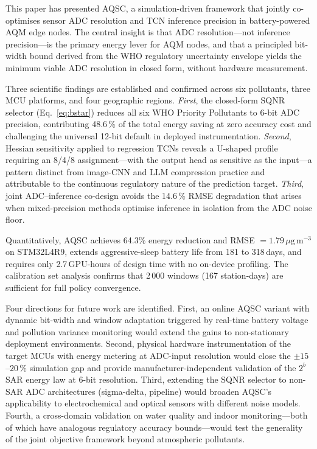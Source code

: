 \documentclass[12pt,a4paper]{article}
\begin{document}
This paper has presented AQSC, a simulation-driven framework that
jointly co-optimises sensor ADC resolution and TCN inference precision
in battery-powered AQM edge nodes.
The central insight is that ADC resolution---not inference
precision---is the primary energy lever for AQM nodes, and that
a principled bit-width bound derived from the WHO regulatory
uncertainty envelope yields the minimum viable ADC resolution
in closed form, without hardware measurement.

Three scientific findings are established and confirmed across six
pollutants, three MCU platforms, and four geographic regions.
\textit{First}, the closed-form SQNR selector (Eq.~\eqref{eq:bstar})
reduces all six WHO Priority Pollutants to 6-bit ADC precision,
contributing 48.6\,\% of the total energy saving at zero accuracy
cost and challenging the universal 12-bit default in deployed
instrumentation.
\textit{Second}, Hessian sensitivity applied to regression TCNs
reveals a U-shaped profile requiring an 8/4/8 assignment---with
the output head as sensitive as the input---a pattern distinct from
image-CNN and LLM compression practice and attributable to the
continuous regulatory nature of the prediction target.
\textit{Third}, joint ADC--inference co-design avoids the 14.6\,\%
RMSE degradation that arises when mixed-precision methods optimise
inference in isolation from the ADC noise floor.

Quantitatively, AQSC achieves 64.3\% energy reduction and
RMSE $=1.79\,\mu\mathrm{g\,m^{-3}}$ on STM32L4R9, extends
aggressive-sleep battery life from 181 to 318\,days, and requires
only 2.7\,GPU-hours of design time with no on-device profiling.
The calibration set analysis confirms that 2\,000 windows (167
station-days) are sufficient for full policy convergence.

Four directions for future work are identified.
First, an online AQSC variant with dynamic bit-width and window
adaptation triggered by real-time battery voltage and pollution
variance monitoring would extend the gains to non-stationary
deployment environments.
Second, physical hardware instrumentation of the target MCUs with
energy metering at ADC-input resolution would close the $\pm15$--$20\,\%$
simulation gap and provide manufacturer-independent validation
of the $2^b$ SAR energy law at 6-bit resolution.
Third, extending the SQNR selector to non-SAR ADC architectures
(sigma-delta, pipeline) would broaden AQSC's applicability to
electrochemical and optical sensors with different noise models.
Fourth, a cross-domain validation on water quality and indoor
 monitoring---both of which have analogous regulatory
accuracy bounds---would test the generality of the joint
objective framework beyond atmospheric pollutants.
\end{document}
